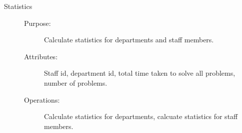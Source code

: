 \begin{description}
\item[Statistics]\hfill
\begin{description}
\item[Purpose:]Calculate statistics for departments and staff members.
\item[Attributes:] Staff id, department id, total time taken to solve all problems, number of problems.
\item[Operations:]Calculate statistics for departments, calcuate statistics for staff members.
\end{description}
\end{description}